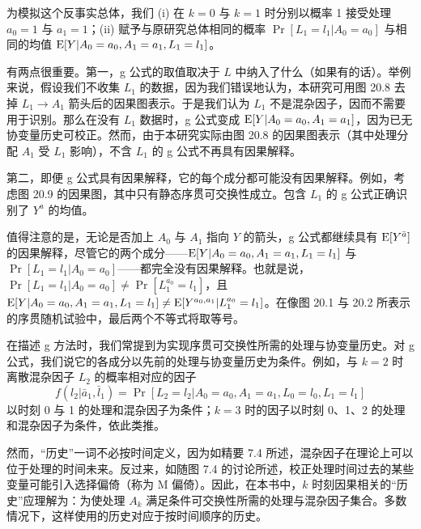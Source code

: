 为模拟这个反事实总体，我们 (i) 在 $k=0$ 与 $k=1$ 时分别以概率 1 接受处理 $a_0=1$ 与 $a_1=1$；(ii) 赋予与原研究总体相同的概率 $\Pr[L_1=l_1|A_0=a_0]$ 与相同的均值 $\mathrm{E}[Y|A_0=a_0,A_1=a_1,L_1=l_1]$。

有两点很重要。第一，g 公式的取值取决于 $L$ 中纳入了什么（如果有的话）。举例来说，假设我们不收集 $L_1$ 的数据，因为我们错误地认为，本研究可用图 20.8 去掉 $L_1\to A_1$ 箭头后的因果图表示。于是我们认为 $L_1$ 不是混杂因子，因而不需要用于识别。那么在没有 $L_1$ 数据时，g 公式变成 $\mathrm{E}[Y|A_0=a_0,A_1=a_1]$，因为已无协变量历史可校正。然而，由于本研究实际由图 20.8 的因果图表示（其中处理分配 $A_1$ 受 $L_1$ 影响），不含 $L_1$ 的 g 公式不再具有因果解释。

第二，即便 g 公式具有因果解释，它的每个成分都可能没有因果解释。例如，考虑图 20.9 的因果图，其中只有静态序贯可交换性成立。包含 $L_1$ 的 g 公式正确识别了 $Y^{a}$ 的均值。


值得注意的是，无论是否加上 $A_0$ 与 $A_1$ 指向 $Y$ 的箭头，g 公式都继续具有 $\mathrm{E}[Y^{\bar a}]$ 的因果解释，尽管它的两个成分——$\mathrm{E}[Y|A_0=a_0,A_1=a_1,L_1=l_1]$ 与 $\Pr[L_1=l_1|A_0=a_0]$——都完全没有因果解释。也就是说，$\Pr[L_1=l_1|A_0=a_0]\neq\Pr[L_1^{a_0}=l_1]$，且 $\mathrm{E}[Y|A_0=a_0,A_1=a_1,L_1=l_1]\neq\mathrm{E}[Y^{a_0,a_1}|L_1^{a_0}=l_1]$。在像图 20.1 与 20.2 所表示的序贯随机试验中，最后两个不等式将取等号。

\renewcommand{\FPname}{精要（Fine Point）}
\begin{finepoint}[处理与协变量历史]
在描述 g 方法时，我们常提到为实现序贯可交换性所需的处理与协变量历史。对 g 公式，我们说它的各成分以先前的处理与协变量历史为条件。例如，与 $k=2$ 时离散混杂因子 $L_2$ 的概率相对应的因子
\[
f(l_2|\bar a_1,\bar l_1)=\Pr[L_2=l_2|A_0=a_0,A_1=a_1,L_0=l_0,L_1=l_1]
\]
以时刻 0 与 1 的处理和混杂因子为条件；$k=3$ 时的因子以时刻 0、1、2 的处理和混杂因子为条件，依此类推。

然而，“历史”一词不必按时间定义，因为如精要 7.4 所述，混杂因子在理论上可以位于处理的时间未来。反过来，如随图 7.4 的讨论所述，校正处理时间过去的某些变量可能引入选择偏倚（称为 M 偏倚）。因此，在本书中，$k$ 时刻因果相关的“历史”应理解为：为使处理 $A_k$ 满足条件可交换性所需的处理与混杂因子集合。多数情况下，这样使用的历史对应于按时间顺序的历史。
\end{finepoint}
\renewcommand{\FPname}{精要}

